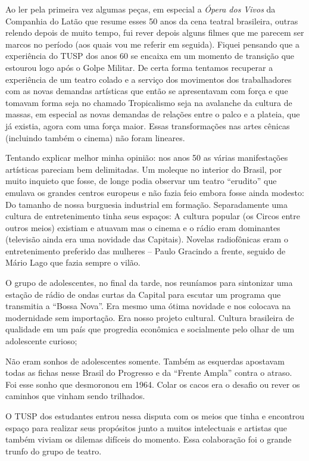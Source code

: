 Ao ler pela primeira vez algumas peças, em especial a \textit{Ópera dos
Vivos} da Companhia do Latão que resume esses 50 anos da cena teatral
brasileira, outras relendo depois de muito tempo, fui rever depois
alguns filmes que me parecem ser marcos no período (aos quais vou me
referir em seguida). Fiquei pensando que a experiência do TUSP dos anos
60 se encaixa em um momento de transição que estourou logo após o Golpe
Militar. De certa forma tentamos recuperar a experiência de um teatro
colado e a serviço dos movimentos dos trabalhadores com as novas
demandas artísticas que então se apresentavam com força e que tomavam
forma seja no chamado Tropicalismo seja na avalanche da cultura de
massas, em especial as novas demandas de relações entre o palco e a
plateia, que já existia, agora com uma força maior. Essas transformações
nas artes cênicas (incluindo também o cinema) não foram lineares.

Tentando explicar melhor minha opinião: nos anos 50 as várias
manifestações artísticas pareciam bem delimitadas. Um moleque no
interior do Brasil, por muito inquieto que fosse, de longe podia
observar um teatro “erudito” que emulava os grandes centros europeus e
não fazia feio embora fosse ainda modesto: Do tamanho de nossa burguesia
industrial em formação. Separadamente uma cultura de entretenimento
tinha seus espaços: A cultura popular (os Circos entre outros meios)
existiam e atuavam mas o cinema e o rádio eram dominantes (televisão
ainda era uma novidade das Capitais). Novelas radiofônicas eram o
entretenimento preferido das mulheres -- Paulo Gracindo a frente,
seguido de Mário Lago que fazia sempre o vilão.

O grupo de adolescentes, no final da tarde, nos reuníamos para
sintonizar uma estação de rádio de ondas curtas da Capital para escutar
um programa que transmitia a “Bossa Nova”. Era mesmo uma ótima novidade
e nos colocava na modernidade sem importação. Era nosso projeto
cultural. Cultura brasileira de qualidade em um país que progredia
econômica e socialmente pelo olhar de um adolescente curioso;

Não eram sonhos de adolescentes somente. Também as esquerdas apostavam
todas as fichas nesse Brasil do Progresso e da “Frente Ampla” contra o
atraso. Foi esse sonho que desmoronou em 1964. Colar os cacos era o
desafio ou rever os caminhos que vinham sendo trilhados.

O TUSP dos estudantes entrou nessa disputa com os meios que tinha e
encontrou espaço para realizar seus propósitos junto a muitos
intelectuais e artistas que também viviam os dilemas difíceis do
momento. Essa colaboração foi o grande trunfo do grupo de teatro.

